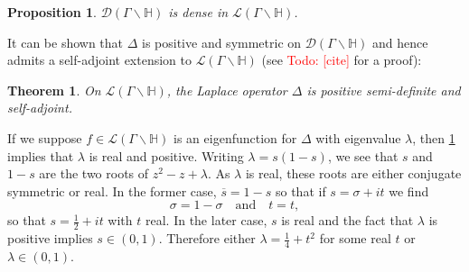 \documentclass[12pt]{book}
\newtheorem{theorem}{Theorem}[section]
\newtheorem{proposition}{Proposition}[section]
\theoremstyle{definition}\newframedtheorem{method}{Method}
\newcommand{\mc}{\mathcal}
\renewcommand{\H}{\mathbb{H}}
\renewcommand{\l}{\lambda}
\newcommand{\s}{\sigma}
\newcommand{\G}{\Gamma}
\newcommand{\D}{\Delta}
\newcommand{\<}{\langle}
\renewcommand{\>}{\rangle}
\newcommand{\conj}{\overline}
\newcommand{\GH}{\G\backslash\H}
\newcommand{\todo}[1]{\textcolor{red}{\sf Todo: [#1]}}
\begin{document}
      \begin{proposition}\label{prop:dense_subspace_of_square-integrable_modular_functions}
        $\mc{D}(\GH)$ is dense in $\mc{L}(\GH)$.
      \end{proposition}

      It can be shown that $\D$ is positive and symmetric on $\mc{D}(\GH)$ and hence admits a self-adjoint extension to $\mc{L}(\GH)$ (see \todo{cite} for a proof):

      \begin{theorem}\label{thm:Laplace_semi-definite_self-adjoint}
        On $\mc{L}(\GH)$, the Laplace operator $\D$ is positive semi-definite and self-adjoint.
      \end{theorem}

      If we suppose $f \in \mc{L}(\GH)$ is an eigenfunction for $\D$ with eigenvalue $\l$, then \cref{thm:Laplace_semi-definite_self-adjoint} implies that $\l$ is real and positive. Writing $\l = s(1-s)$, we see that $s$ and $1-s$ are the two roots of $z^{2}-z+\l$. As $\l$ is real, these roots are either conjugate symmetric or real. In the former case, $\conj{s} = 1-s$ so that if $s = \s+it$ we find
      \[
        \s = 1-\s \quad \text{and} \quad t = t,
      \]
      so that $s = \frac{1}{2}+it$ with $t$ real. In the later case, $s$ is real and the fact that $\l$ is positive implies $s \in (0,1)$. Therefore either $\l = \frac{1}{4}+t^{2}$ for some real $t$ or $\l \in (0,1)$.
\end{document}
